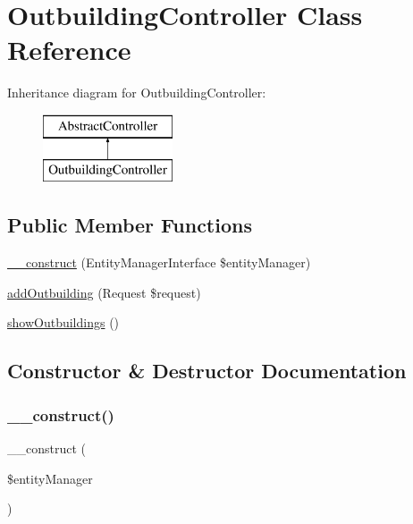 \hypertarget{class_app_1_1_controller_1_1_outbuilding_controller}{}\section{Outbuilding\+Controller Class Reference}
\label{class_app_1_1_controller_1_1_outbuilding_controller}
Inheritance diagram for Outbuilding\+Controller\+:\begin{figure}[H]
\begin{center}
\leavevmode
\includegraphics[height=2.000000cm]{class_app_1_1_controller_1_1_outbuilding_controller}
\end{center}
\end{figure}
\subsection*{Public Member Functions}
\begin{DoxyCompactItemize}
\item 
\mbox{\hyperlink{class_app_1_1_controller_1_1_outbuilding_controller_abb5fb9a65dd8a81e7482dddbf71c5177}{\+\_\+\+\_\+construct}} (Entity\+Manager\+Interface \$entity\+Manager)
\item 
\mbox{\hyperlink{class_app_1_1_controller_1_1_outbuilding_controller_a5e190c2093a15324887095142f1bde4e}{add\+Outbuilding}} (Request \$request)
\item 
\mbox{\hyperlink{class_app_1_1_controller_1_1_outbuilding_controller_a7c8cb25e70d8480ab028228b93a780df}{show\+Outbuildings}} ()
\end{DoxyCompactItemize}


\subsection{Constructor \& Destructor Documentation}
\mbox{\label{class_app_1_1_controller_1_1_outbuilding_controller_abb5fb9a65dd8a81e7482dddbf71c5177}} 
\subsubsection{\texorpdfstring{\_\_construct()}{\_\_construct()}}
{\footnotesize\ttfamily \+\_\+\+\_\+construct (\begin{DoxyParamCaption}\item[{Entity\+Manager\+Interface}]{\$entity\+Manager }\end{DoxyParamCaption})}

